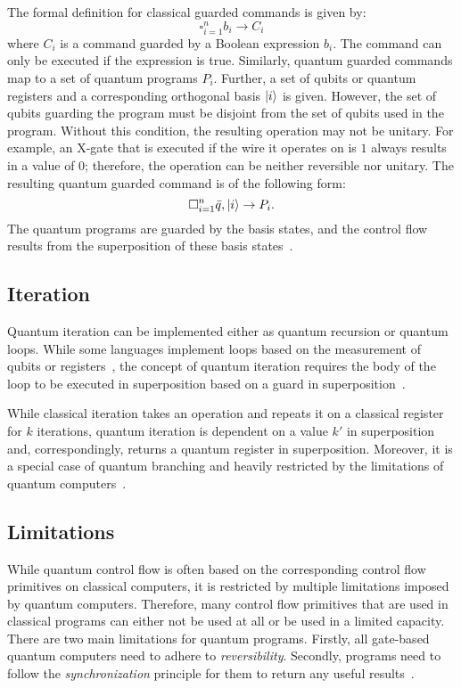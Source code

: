 The formal definition for classical guarded commands is given by:
\begin{equation*}
    \square^n_{i=1} b_i \to C_i
\end{equation*}
where $C_i$ is a command guarded by a Boolean expression $b_i$. The command can only be executed if the expression is true. Similarly, quantum guarded commands map to a set of quantum programs $P_i$. Further, a set of qubits or quantum registers and a corresponding orthogonal basis $\ket{i}$ is given. However, the set of qubits guarding the program must be disjoint from the set of qubits used in the program. Without this condition, the resulting operation may not be unitary. For example, an X-gate that is executed if the wire it operates on is $1$ always results in a value of $0$; therefore, the operation can be neither reversible nor unitary. The resulting quantum guarded command is of the following form:
\begin{equation*}
    \square^n_{i=1} \bar{q}, \ket{i} \to P_i.
\end{equation*} 
The quantum programs are guarded by the basis states, and the control flow results from the superposition of these basis states~\cite{YYF12}. 

\subsection{Iteration}
\label{sec:background_iteration}
Quantum iteration can be implemented either as quantum recursion or quantum loops. While some languages implement loops based on the measurement of qubits or registers~\cite{Ying11}, the concept of quantum iteration requires the body of the loop to be executed in superposition based on a guard in superposition~\cite{YYF12}.

While classical iteration takes an operation and repeats it on a classical register for $k$ iterations, quantum iteration is dependent on a value $k'$ in superposition and, correspondingly, returns a quantum register in superposition. Moreover, it is a special case of quantum branching and heavily restricted by the limitations of quantum computers~\cite{YVC24}.

\subsection{Limitations}
\label{sec:background_limitations}	
While quantum control flow is often based on the corresponding control flow primitives on classical computers, it is restricted by multiple limitations imposed by quantum computers. Therefore, many control flow primitives that are used in classical programs can either not be used at all or be used in a limited capacity. There are two main limitations for quantum programs. Firstly, all gate-based quantum computers need to adhere to \emph{reversibility}. Secondly, programs need to follow the \emph{synchronization} principle for them to return any useful results~\cite{YVC24}.

